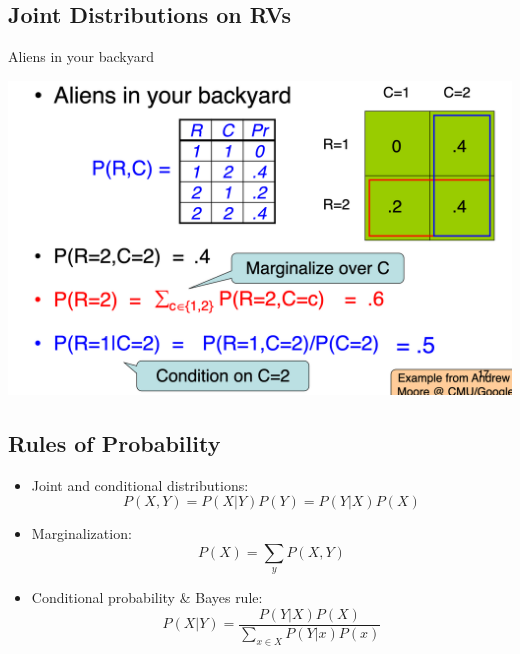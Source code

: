 \documentclass[11pt]{article}
\theoremstyle{definition}
\begin{document}
\subsection{Joint Distributions on RVs}
Aliens in your backyard

\includegraphics[width=\textwidth]{6.png}
\subsection{Rules of Probability}
\begin{itemize}
  \item Joint and conditional distributions:
  \begin{equation}
    P(X,Y) = P(X|Y)P(Y) = P(Y|X)P(X)
  \end{equation}
  \item Marginalization:
  \begin{equation}
    P(X) = \sum_{y} P(X,Y)
  \end{equation}
  \item Conditional probability \& Bayes rule:
  \begin{equation}
    P(X|Y) = \frac{P(Y|X)P(X)}{\sum_{x \in X} P(Y|x)P(x)}
  \end{equation}
\end{itemize}
\end{document}
